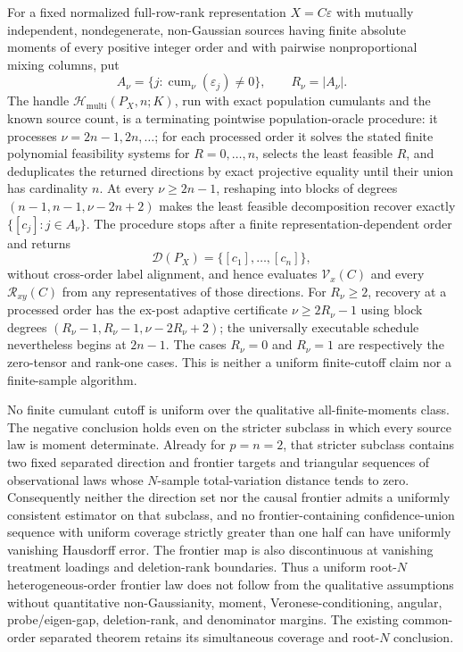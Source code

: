 For a fixed normalized full-row-rank representation \(X=C\varepsilon\) with mutually independent, nondegenerate, non-Gaussian sources having finite absolute moments of every positive integer order and with pairwise nonproportional mixing columns, put
\[
 A_\nu=\{j:\operatorname{cum}_\nu(\varepsilon_j)\ne0\},
 \qquad R_\nu=|A_\nu|.
\]
The handle \(\mathcal H_{\mathrm{multi}}(P_X,n;K)\), run with exact population cumulants and the known source count, is a terminating pointwise population-oracle procedure: it processes \(\nu=2n-1,2n,\ldots\); for each processed order it solves the stated finite polynomial feasibility systems for \(R=0,\ldots,n\), selects the least feasible \(R\), and deduplicates the returned directions by exact projective equality until their union has cardinality \(n\). At every \(\nu\ge2n-1\), reshaping into blocks of degrees \((n-1,n-1,\nu-2n+2)\) makes the least feasible decomposition recover exactly \(\{[c_j]:j\in A_\nu\}\). The procedure stops after a finite representation-dependent order and returns
\[
 \mathcal D(P_X)=\{[c_1],\ldots,[c_n]\},
\]
without cross-order label alignment, and hence evaluates \(\mathcal V_x(C)\) and every \(\mathcal R_{xy}(C)\) from any representatives of those directions. For \(R_\nu\ge2\), recovery at a processed order has the ex-post adaptive certificate \(\nu\ge2R_\nu-1\) using block degrees \((R_\nu-1,R_\nu-1,\nu-2R_\nu+2)\); the universally executable schedule nevertheless begins at \(2n-1\). The cases \(R_\nu=0\) and \(R_\nu=1\) are respectively the zero-tensor and rank-one cases. This is neither a uniform finite-cutoff claim nor a finite-sample algorithm.

No finite cumulant cutoff is uniform over the qualitative all-finite-moments class. The negative conclusion holds even on the stricter subclass in which every source law is moment determinate. Already for \(p=n=2\), that stricter subclass contains two fixed separated direction and frontier targets and triangular sequences of observational laws whose \(N\)-sample total-variation distance tends to zero. Consequently neither the direction set nor the causal frontier admits a uniformly consistent estimator on that subclass, and no frontier-containing confidence-union sequence with uniform coverage strictly greater than one half can have uniformly vanishing Hausdorff error. The frontier map is also discontinuous at vanishing treatment loadings and deletion-rank boundaries. Thus a uniform root-\(N\) heterogeneous-order frontier law does not follow from the qualitative assumptions without quantitative non-Gaussianity, moment, Veronese-conditioning, angular, probe/eigen-gap, deletion-rank, and denominator margins. The existing common-order separated theorem retains its simultaneous coverage and root-\(N\) conclusion.